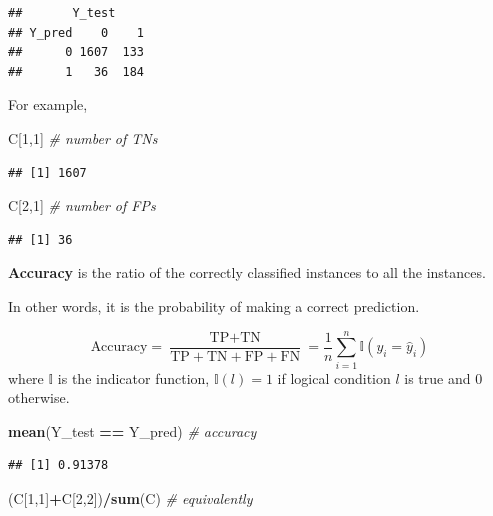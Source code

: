 \documentclass[10pt,b5paper,krantz1]{krantz}
\newenvironment{Shaded}{\begin{snugshade}}{\end{snugshade}}
\newcommand{\CommentTok}[1]{\textcolor[rgb]{0.37,0.37,0.37}{\textit{#1}}}
\newcommand{\DecValTok}[1]{\textcolor[rgb]{0.06,0.06,0.06}{#1}}
\newcommand{\KeywordTok}[1]{\textcolor[rgb]{0.27,0.27,0.27}{\textbf{#1}}}
\newcommand{\NormalTok}[1]{#1}
\newcommand{\OperatorTok}[1]{\textcolor[rgb]{0.43,0.43,0.43}{\textbf{#1}}}
\newcommand{\StringTok}[1]{\textcolor[rgb]{0.5,0.5,0.5}{#1}}
\begin{document}
\begin{verbatim}
##       Y_test
## Y_pred    0    1
##      0 1607  133
##      1   36  184
\end{verbatim}

For example,

\begin{Shaded}
\begin{Highlighting}[]
\NormalTok{C[}\DecValTok{1}\NormalTok{,}\DecValTok{1}\NormalTok{] }\CommentTok{# number of TNs}
\end{Highlighting}
\end{Shaded}

\begin{verbatim}
## [1] 1607
\end{verbatim}

\begin{Shaded}
\begin{Highlighting}[]
\NormalTok{C[}\DecValTok{2}\NormalTok{,}\DecValTok{1}\NormalTok{] }\CommentTok{# number of FPs}
\end{Highlighting}
\end{Shaded}

\begin{verbatim}
## [1] 36
\end{verbatim}

\textbf{Accuracy} is the ratio of the correctly classified instances
to all the instances.

In other words, it is the probability of making a correct prediction.

\[
\text{Accuracy} = \frac{\text{TP}+\text{TN}}{\text{TP}+\text{TN}+\text{FP}+\text{FN}}
= \frac{1}{n} \sum_{i=1}^n \mathbb{I}\left(
y_i = \hat{y}_i
\right)
\]
where \(\mathbb{I}\) is the indicator function,
\(\mathbb{I}(l)=1\) if logical condition \(l\) is true and \(0\) otherwise.

\begin{Shaded}
\begin{Highlighting}[]
\KeywordTok{mean}\NormalTok{(Y_test }\OperatorTok{==}\StringTok{ }\NormalTok{Y_pred) }\CommentTok{# accuracy}
\end{Highlighting}
\end{Shaded}

\begin{verbatim}
## [1] 0.91378
\end{verbatim}

\begin{Shaded}
\begin{Highlighting}[]
\NormalTok{(C[}\DecValTok{1}\NormalTok{,}\DecValTok{1}\NormalTok{]}\OperatorTok{+}\NormalTok{C[}\DecValTok{2}\NormalTok{,}\DecValTok{2}\NormalTok{])}\OperatorTok{/}\KeywordTok{sum}\NormalTok{(C) }\CommentTok{# equivalently}
\end{Highlighting}
\end{Shaded}
\end{document}
